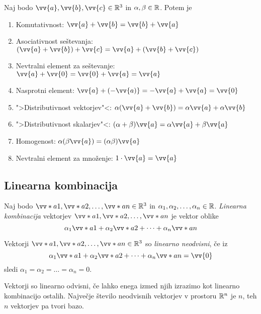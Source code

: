 \documentclass[12pt, a4paper]{article}
\begin{document}
\begin{opomba}
Naj bodo $\vv{a},\vv{b},\vv{c}\in\R^3$ in $\alpha,\beta\in\mathbb{R}$. Potem je

\begin{enumerate}[label=\alph*)]
\item Komutativnost: $\vv{a}+\vv{b}=\vv{b}+\vv{a}$
\item Asociativnost seštevanja: $(\vv{a}+\vv{b})+\vv{c}=\vv{a}+(\vv{b}+\vv{c})$
\item Nevtralni element za seštevanje: $\vv{a}+\vv{0}=\vv{0}+\vv{a}=\vv{a}$
\item Nasprotni element: $\vv{a}+(-\vv{a)}=-\vv{a}+\vv{a}=\vv{0}$
\item ">Distributivnost vektorjev"<: $\alpha(\vv{a}+\vv{b})=\alpha\vv{a}+\alpha\vv{b}$
\item ">Distributivnost skalarjev"<: $(\alpha+\beta)\vv{a}=\alpha\vv{a}+\beta\vv{a}$
\item Homogenost: $\alpha(\beta\vv{a})=(\alpha\beta)\vv{a}$
\item Nevtralni element za množenje: $1\cdot\vv{a}=\vv{a}$
\end{enumerate}
\end{opomba}

\newpage

\subsection{Linearna kombinacija}

\begin{okvir}
\begin{definicija}
Naj bodo $\vv*{a}{1},\vv*{a}{2},\dots,\vv*{a}{n}\in\R^3$ in $\alpha_1,\alpha_2,\dots,\alpha_n\in\mathbb{R}$. \emph{Linearna kombinacija} vektorjev $\vv*{a}{1},\vv*{a}{2},\dots,\vv*{a}{n}$ je vektor oblike
\[
\alpha_1\vv*{a}{1}+\alpha_2\vv*{a}{2}+\dots+\alpha_n\vv*{a}{n}
\]
\end{definicija}
\end{okvir}

\begin{definicija}
Vektorji $\vv*{a}{1},\vv*{a}{2},\dots,\vv*{a}{n}\in\R^3$ so \emph{linearno neodvisni}, če iz
\[
\alpha_1\vv*{a}{1}+\alpha_2\vv*{a}{2}+\dots+\alpha_n\vv*{a}{n}=\vv{0}
\]
sledi $\alpha_1=\alpha_2=\dots=\alpha_n=0$. 
\end{definicija}

\begin{posledica}
Vektorji so linearno odvisni, če lahko enega izmed njih izrazimo kot linearno kombinacijo ostalih. Največje število neodvisnih vektorjev v prostoru $\mathbb{R}^n$ je $n$, teh $n$ vektorjev pa tvori bazo.
\end{posledica}
\end{document}
